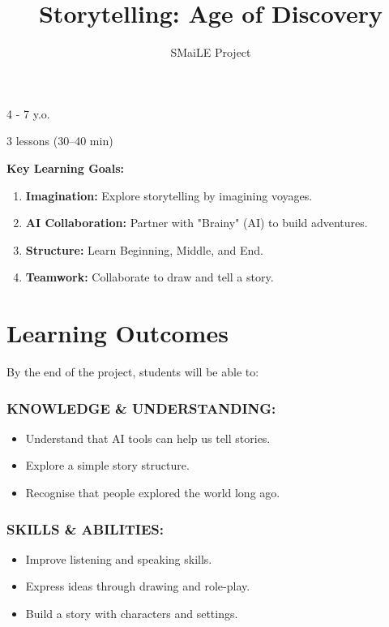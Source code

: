 \documentclass[11pt, a4paper]{article}
\begin{document}
\title{\textbf{\color{SmaileTeal}Storytelling: Age of Discovery}}
\author{SMaiLE Project}
\date{}
\maketitle
\thispagestyle{plain}

\begin{keyinfobox}
    \begin{description}[leftmargin=*, labelindent=0pt]
        \item[\bfseries\color{SmaileTeal} Target Group:] 4 - 7 y.o.
        \item[\bfseries\color{SmaileTeal} Duration:] 3 lessons (30--40 min)
    \end{description}
    \textbf{Key Learning Goals:}
    \begin{enumerate}
        \item \textbf{Imagination:} Explore storytelling by imagining voyages.
        \item \textbf{AI Collaboration:} Partner with "Brainy" (AI) to build adventures.
        \item \textbf{Structure:} Learn Beginning, Middle, and End.
        \item \textbf{Teamwork:} Collaborate to draw and tell a story.
    \end{enumerate}
\end{keyinfobox}

\section*{Learning Outcomes}
By the end of the project, students will be able to:

\subsubsection*{KNOWLEDGE \& UNDERSTANDING:}
\begin{itemize}
    \item Understand that AI tools can help us tell stories.
    \item Explore a simple story structure.
    \item Recognise that people explored the world long ago.
\end{itemize}

\subsubsection*{SKILLS \& ABILITIES:}
\begin{itemize}
    \item Improve listening and speaking skills.
    \item Express ideas through drawing and role-play.
    \item Build a story with characters and settings.
\end{itemize}
\end{document}
